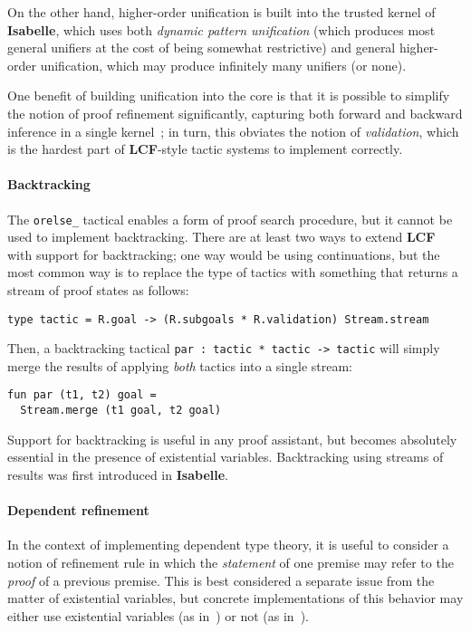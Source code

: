 \documentclass{article}
\newcommand\FormatLang[1]{{\bfseries\sffamily #1}}
\newcommand\LCF{\FormatLang{LCF}}
\newcommand\Isabelle{\FormatLang{Isabelle}}
\theoremstyle{definition}
\theoremstyle{remark}
\begin{document}
On the other hand, higher-order unification is built into the trusted
kernel of \Isabelle{}, which uses both \emph{dynamic pattern
  unification} (which produces most general unifiers at the cost of
being somewhat restrictive) and general higher-order unification,
which may produce infinitely many unifiers (or none).

One benefit of building unification into the core is that it is
possible to simplify the notion of proof refinement significantly,
capturing both forward and backward inference in a single
kernel~\cite{paulson:1998}; in turn, this obviates the notion of
\emph{validation}, which is the hardest part of \LCF{}-style tactic
systems to implement correctly.


\paragraph{Backtracking}
The \verb|orelse_| tactical enables a form of proof search procedure,
but it cannot be used to implement backtracking. There are at least
two ways to extend \LCF{} with support for backtracking; one way would
be using continuations, but the most common way is to replace the type
of tactics with something that returns a stream of proof states as
follows:
\begin{verbatim}
type tactic = R.goal -> (R.subgoals * R.validation) Stream.stream
\end{verbatim}

Then, a backtracking tactical \verb|par : tactic * tactic -> tactic|
will simply merge the results of applying \emph{both} tactics into a
single stream:
\begin{verbatim}
fun par (t1, t2) goal =
  Stream.merge (t1 goal, t2 goal)
\end{verbatim}

Support for backtracking is useful in any proof assistant, but becomes
absolutely essential in the presence of existential
variables. Backtracking using streams of results was first introduced
in \Isabelle.


\paragraph{Dependent refinement}
In the context of implementing dependent type theory, it is useful to
consider a notion of refinement rule in which the \emph{statement} of
one premise may refer to the \emph{proof} of a previous premise. This
is best considered a separate issue from the matter of existential
variables, but concrete implementations of this behavior may either
use existential variables (as in~\cite{spiwack:2011,asperti:2011}) or not (as
in~\cite{sterling-harper:2017,redprl:2016}).



\end{document}
